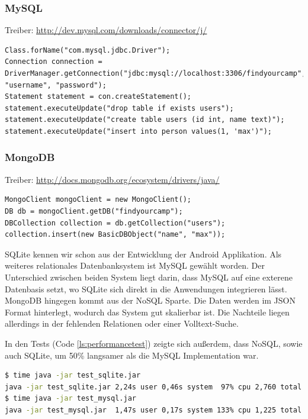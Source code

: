\subsubsection{MySQL}

Treiber: \url{http://dev.mysql.com/downloads/connector/j/}
\begin{lstlisting}[label=ls:mysqlexample,caption=Exemplarische Darstellung der Nutzung des MySQL Treibers]
Class.forName("com.mysql.jdbc.Driver");
Connection connection = DriverManager.getConnection("jdbc:mysql://localhost:3306/findyourcamp", "username", "password");
Statement statement = con.createStatement();
statement.executeUpdate("drop table if exists users");
statement.executeUpdate("create table users (id int, name text)");
statement.executeUpdate("insert into person values(1, 'max')");
\end{lstlisting}

\subsubsection{MongoDB}

Treiber: \url{http://docs.mongodb.org/ecosystem/drivers/java/}
\begin{lstlisting}[label=ls:mongoexample,caption=Exemplarische Darstellung der Nutzung des MongoDB Treibers]
MongoClient mongoClient = new MongoClient();
DB db = mongoClient.getDB("findyourcamp");
DBCollection collection = db.getCollection("users");
collection.insert(new BasicDBObject("name", "max"));
\end{lstlisting}

SQLite kennen wir schon aus der Entwicklung der Android Applikation. Als weiteres relationales Datenbanksystem ist MySQL gewählt worden. Der Unterschied zwischen beiden System liegt darin, dass MySQL auf eine exterene Datenbasis setzt, wo SQLite sich direkt in die Anwendungen integrieren lässt. MongoDB hingegen kommt aus der NoSQL Sparte. Die Daten werden im JSON Format hinterlegt, wodurch das System gut skalierbar ist. Die Nachteile liegen allerdings in der fehlenden Relationen oder einer Volltext-Suche.

In den Tests (Code \ref{ls:performancetest}) zeigte sich außerdem, dass NoSQL, sowie auch SQLite, um 50\% langsamer als die MySQL Implementation war.

\begin{lstlisting}[label=ls:performancetest,caption=Perfomancetest zwischen MySQL und SQLite,language=bash]
$ time java -jar test_sqlite.jar
java -jar test_sqlite.jar 2,24s user 0,46s system  97% cpu 2,760 total
$ time java -jar test_mysql.jar
java -jar test_mysql.jar  1,47s user 0,17s system 133% cpu 1,225 total
\end{lstlisting}

